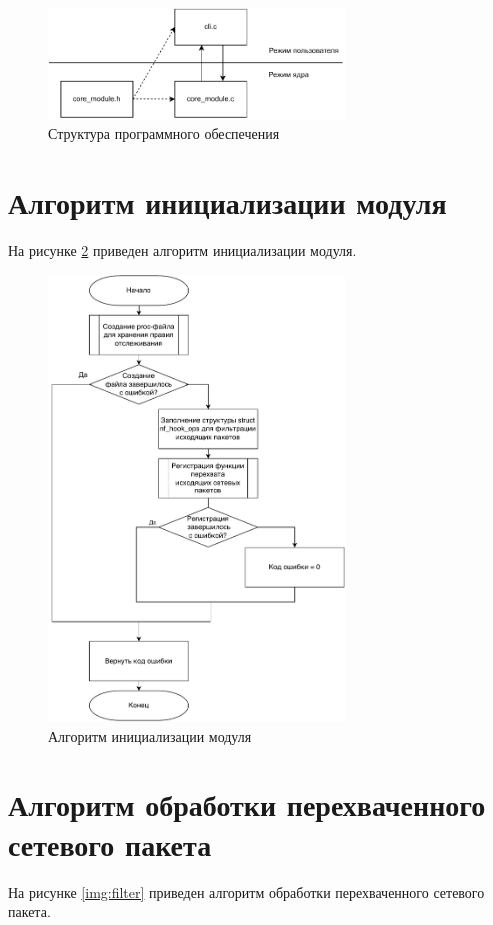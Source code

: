 \documentclass{bmstu}
\begin{document}
\begin{figure}[hbtp]
 \centering
 \includegraphics[width=0.7\textwidth]{inc/img/po_struct.pdf}
 \caption{Структура программного обеспечения}
 \label{img:structure}
\end{figure}

\newpage
\section{Алгоритм инициализации модуля}
На рисунке \ref{img:register} приведен алгоритм инициализации модуля.

\begin{figure}[hbtp]
 \centering
 \includegraphics[width=0.7\textwidth]{inc/img/init.pdf}
 \caption{Алгоритм инициализации модуля}
 \label{img:register}
\end{figure}

\newpage
\section{Алгоритм обработки перехваченного сетевого пакета}
На рисунке \ref{img:filter} приведен алгоритм обработки перехваченного сетевого пакета.
\end{document}
